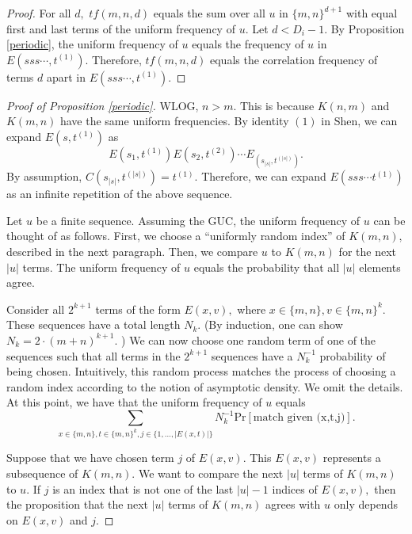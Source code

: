 \documentclass[11pt]{amsart} %
\begin{document}
\begin{proof}
For all $d,$ $tf(m,n,d)$ equals the sum over all $u$ in $\{m,n\}^{d+1}$ with equal first and last terms of the uniform frequency of $u.$ Let $d < D_i - 1.$ By Proposition \ref{periodic}, the 
uniform frequency of $u$ equals the frequency of $u$ in $E(s s s \cdots, t^{(1)}).$ Therefore, $tf(m,n,d)$ equals the correlation frequency of terms $d$ apart in $E(s s s \cdots, t^{(1)}).$
\end{proof}

\begin{proof}[Proof of Proposition \ref{periodic}] 
WLOG, $n > m.$ This is because $K(n,m)$ and $K(m,n)$ have the same uniform frequencies. By identity $(1)$ in Shen\cite{Shen}, we can expand $E(s, t^{(1)})$ as
\[ E(s_1, t^{(1)}) E(s_2, t^{(2)}) \cdots E_(s_{|s|}, t^{(|s|)}).\]
By assumption, $C(s_{|s|}, t^{(|s|)}) = t^{(1)}.$ Therefore, we can expand $E(s s s \cdots t^{(1)})$ as an infinite repetition of the above sequence.

Let $u$ be a finite sequence. Assuming the GUC, the uniform frequency of $u$ can be thought of as follows. First, we choose a ``uniformly random index'' of $K(m,n),$ described in the next paragraph. Then, we compare $u$ to $K(m,n)$ for the next $|u|$ terms. The uniform frequency of $u$ equals the probability that all $|u|$ elements agree. 

 Consider all $2^{k+1}$ terms of the form $E(x, v),$ where $x \in \{m, n\}, v \in \{m, n\}^k.$ These sequences have a total length $N_k$. (By induction, one can show $N_k = 2 \cdot (m+n)^{k+1}.$ ) We can now choose one random term of one of the sequences such that all terms in the $2^{k+1}$ sequences have a $N_k^{-1}$ probability of being chosen. Intuitively, this random process matches the process of choosing a random index according to the notion of asymptotic density. We omit the details. At this point, we have that the uniform frequency of $u$ equals
 \[ \sum_{x \in \{m, n\}, t \in \{m, n\}^k, j \in \{1, \ldots, |E(x,t)|\}} N_k^{-1} \text{Pr}[\text{match given (x,t,j)}].\]
 
  Suppose that we have chosen term $j$ of $E(x,v).$ This $E(x,v)$ represents a subsequence of $K(m,n).$ We want to compare the next $|u|$ terms of $K(m,n)$ to $u.$ If $j$ is an index that is not one of the last $|u|-1$ indices of $E(x,v),$ then the proposition that the next $|u|$ terms of $K(m,n)$ agrees with $u$ only depends on $E(x,v)$ and $j.$ 


\end{proof}
\end{document}
